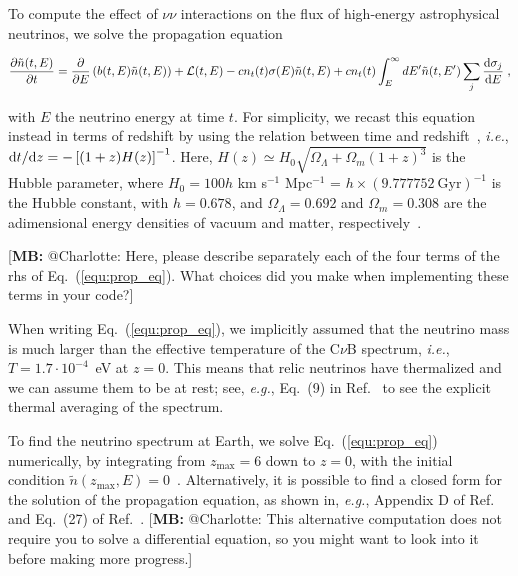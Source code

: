\documentclass[aps,twocolumn,prd,showpacs,showkeys,preprintnumbers,superscriptaddress,nobibnotes,floatfix,longbibliography]{revtex4-1}
\newcommand{\ie}{{\it i.e.}}
\newcommand{\eg}{{\it e.g.}}
\newcommand{\eq}{Eq.}
\newcommand{\Ref}{Ref.}
\newcommand{\equ}[1]{\eq~(\ref{equ:#1})}
\newcommand{\MB}[1]{{\color{blue}[{\bf MB:} #1]}}
\begin{document}
To compute the effect of $\nu \nu$ interactions on the flux of high-energy astrophysical neutrinos, we solve the propagation equation 
\begin{widetext}
 \begin{equation}\label{equ:prop_eq}
  \frac {\partial \tilde{n}(t,E)} {\partial t}
  =
  \frac {\partial} {\partial E} \left( b(t,E) \tilde{n}(t,E) \right)
  + \mathcal{L}(t, E)
  - c n_t(t) \sigma(E) \tilde{n}(t,E)
  + c n_t(t) \int_E^\infty dE^\prime \tilde{n}(t,E^\prime) \sum_j \frac {{\rm d} \sigma_j} {{\rm d}E} \;,
 \end{equation}
\end{widetext}
with $E$ the neutrino energy at time $t$.  For simplicity, we recast this equation instead in terms of redshift by using the relation between time and redshift\ \cite{Hogg:1999ad}, \ie, ${\rm d}t/{\rm d}z = -\left[ (1+z) H(z) \right]^{-1}$.  Here, $H(z) \simeq H_0 \sqrt{\Omega_\Lambda + \Omega_m(1+z)^3}$ is the Hubble parameter, where $H_0 = 100 h$ km s$^{-1}$ Mpc$^{-1}$ = $h \times (9.777752~\text{Gyr})^{-1}$ is the Hubble constant, with $h = 0.678$, and $\Omega_\Lambda = 0.692$ and $\Omega_m = 0.308$ are the adimensional energy densities of vacuum and matter, respectively\ \cite{Tanabashi:2018oca}. 

\MB{@Charlotte: Here, please describe separately each of the four terms of the rhs of \equ{prop_eq}.  What choices did you make when implementing these terms in your code?}

When writing \equ{prop_eq}, we implicitly assumed that the neutrino mass is much larger than the effective temperature of the C$\nu$B spectrum, \ie, $T = 1.7 \cdot 10^{-4}$~eV at $z=0$.  This means that relic neutrinos have thermalized and we can assume them to be at rest; see, \eg, Eq.~(9) in \Ref\ \cite{DiFranzo:2015qea} to see the explicit thermal averaging of the spectrum.

To find the neutrino spectrum at Earth, we solve \equ{prop_eq} numerically, by integrating from $z_{\max} = 6$ down to $z=0$, with the initial condition $\tilde{n}(z_{\max}, E) = 0$\ \cite{Ng:2014pca}.  Alternatively, it is possible to find a closed form for the solution of the propagation equation, as shown in, \eg, Appendix D of \Ref\ \cite{Ahlers:2009rf} and Eq.~(27) of \Ref\ \cite{Farzan:2014gza}. \MB{@Charlotte: This alternative computation does not require you to solve a differential equation, so you might want to look into it before making more progress.}


\end{document}

